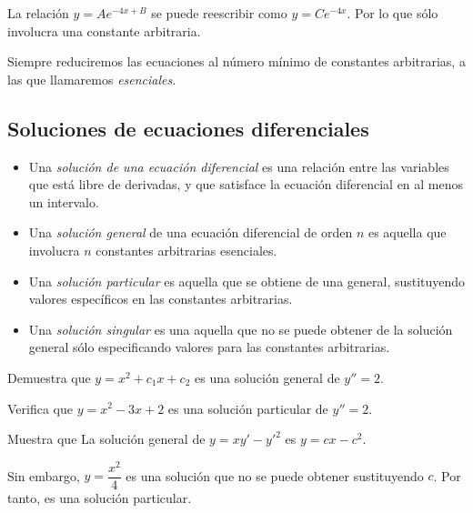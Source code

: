 	\begin{ejemplo}
		La relación $ y = Ae^{-4x+B} $ se puede reescribir como $ y = Ce^{-4x} $.  Por lo que sólo involucra una constante arbitraria.
	\end{ejemplo}


\begin{observacion}

	Siempre reduciremos las ecuaciones al número mínimo de constantes arbitrarias, a las que llamaremos \emph{esenciales}.

\end{observacion}


\subsection{Soluciones de ecuaciones diferenciales}

\begin{itemize}
	\item 	Una \emph{solución de una ecuación diferencial} es una relación entre las variables que está libre de derivadas, y que satisface la ecuación diferencial en al menos un intervalo.
	\item
	Una \emph{solución general} de una ecuación diferencial de orden $ n $ es aquella que involucra $ n $ constantes arbitrarias esenciales.
	\item 	Una \emph{solución particular} es aquella que se obtiene de una general, sustituyendo valores específicos en las constantes arbitrarias.
	\item 	Una \emph{solución singular} es una aquella que no se puede obtener de la solución general sólo especificando valores para las constantes arbitrarias.
\end{itemize}



	\begin{resuelto}
		\label{exmp 02:06}
		Demuestra que $ y=x^{2}+c_{1}x+c_{2} $ es una solución general de $ y''=2 $.
	\end{resuelto}

	\begin{resuelto}
		\label{exmp 02:08}
		Verifica que $ y = x^2-3x+2 $ es una solución particular de $ y''=2 $.
	\end{resuelto}

	\begin{resuelto}
		Muestra que La solución general de $ y = xy'-y'^{2} $ es $ y = cx-c^{2} $.
		\begin{observacion}

			Sin embargo, $ y=\dfrac{x^{2}}{4} $ es una solución que no se puede obtener sustituyendo $ c $.  Por tanto, es una solución particular.
		\end{observacion}
	\end{resuelto}


